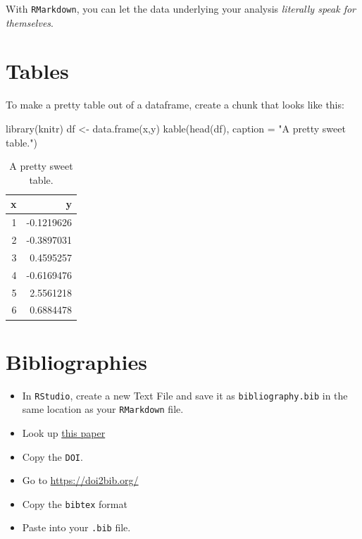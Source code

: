 \documentclass[
]{book}
\newenvironment{Shaded}{\begin{snugshade}}{\end{snugshade}}
\newcommand{\AttributeTok}[1]{\textcolor[rgb]{0.77,0.63,0.00}{#1}}
\newcommand{\FunctionTok}[1]{\textcolor[rgb]{0.00,0.00,0.00}{#1}}
\newcommand{\NormalTok}[1]{#1}
\newcommand{\OtherTok}[1]{\textcolor[rgb]{0.56,0.35,0.01}{#1}}
\newcommand{\StringTok}[1]{\textcolor[rgb]{0.31,0.60,0.02}{#1}}
\begin{document}
With \texttt{RMarkdown}, you can let the data underlying your analysis \emph{literally speak for themselves}.

\hypertarget{tables}{%
\section*{Tables}\label{tables}}

To make a pretty table out of a dataframe, create a chunk that looks like this:

\begin{Shaded}
\begin{Highlighting}[]
\FunctionTok{library}\NormalTok{(knitr)}
\NormalTok{df }\OtherTok{\textless{}{-}} \FunctionTok{data.frame}\NormalTok{(x,y)}
\FunctionTok{kable}\NormalTok{(}\FunctionTok{head}\NormalTok{(df), }\AttributeTok{caption =} \StringTok{"A pretty sweet table."}\NormalTok{)}
\end{Highlighting}
\end{Shaded}

\begin{table}

\caption{\label{tab:unnamed-chunk-216}A pretty sweet table.}
\centering
\begin{tabular}[t]{r|r}
\hline
x & y\\
\hline
1 & -0.1219626\\
\hline
2 & -0.3897031\\
\hline
3 & 0.4595257\\
\hline
4 & -0.6169476\\
\hline
5 & 2.5561218\\
\hline
6 & 0.6884478\\
\hline
\end{tabular}
\end{table}

\hypertarget{bibliographies}{%
\section*{Bibliographies}\label{bibliographies}}

\begin{itemize}
\item
  In \texttt{RStudio}, create a new Text File and save it as \texttt{bibliography.bib} in the same location as your \texttt{RMarkdown} file.
\item
  Look up \href{https://www.researchgate.net/publication/260642613_Statistical_exponential_formulas_for_homogeneous_diffusion}{this paper}
\item
  Copy the \texttt{DOI}.
\item
  Go to \url{https://doi2bib.org/}
\item
  Copy the \texttt{bibtex} format
\item
  Paste into your \texttt{.bib} file.
\end{itemize}
\end{document}
